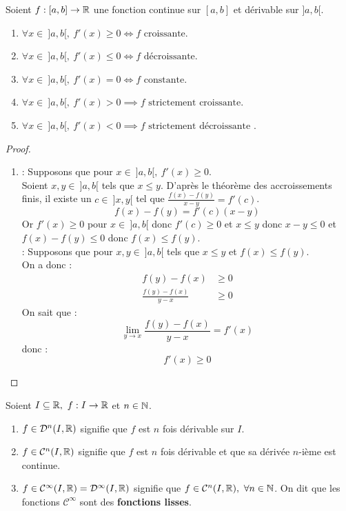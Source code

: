\begin{proposition}
    Soient $f : [a, b] \to \mathbb{R}$ une fonction continue sur $[a, b]$ et dérivable sur $]a, b[$.
    \begin{enumerate}
            \item $\forall x \in \ ]a, b[,\ f'(x) \geq 0 \iff f \text{ croissante}$.
            \item $\forall x \in \ ]a, b[,\ f'(x) \leq 0 \iff f \text{ décroissante}$.
            \item $\forall x \in \ ]a, b[,\ f'(x) = 0 \iff f \text{ constante}$.
            \item $\forall x \in \ ]a, b[,\ f'(x) > 0 \implies f \text{ strictement croissante}$.
            \item $\forall x \in \ ]a, b[,\ f'(x) < 0 \implies f \text{ strictement décroissante}$ .
        \end{enumerate}
\end{proposition}

\begin{proof}
	\leavevmode
	\begin{enumerate}
		\item \boxed{\implies} : Supposons que pour $x \in \ ]a, b[,\ f'(x) \geq 0$. \\
		Soient $x, y \in \ ]a, b[$ tels que $x \leq y$. D'après le théorème des accroissements finis, il existe un $c \in \ ]x, y[$ tel que $\frac{f(x) - f(y)}{x - y} = f'(c)$.
		\[ f(x) - f(y) = f'(c)(x - y) \]
		Or $f'(x) \geq 0$ pour $x \in \ ]a, b[$ donc $f'(c) \geq 0$ et $x \leq y$ donc $x - y \leq 0$ et $f(x) - f(y) \leq 0$ donc  $f(x) \leq f(y)$.
		\\
		\boxed{\impliedby} : Supposons que pour $x, y \in \ ]a, b[$ tels que $x \leq y$ et $f(x) \leq f(y)$. \\
		On a donc :
		\begin{align*}
			f(y) - f(x) &\geq 0 \\
			\frac{f(y) - f(x)}{y - x} &\geq 0 
		\end{align*}
		On sait que :
		\[ \lim_{y \to x} \frac{f(y) - f(x)}{y - x} = f'(x) \]
		donc :
		\[ f'(x) \geq 0 \]
	\end{enumerate}
\end{proof}

\begin{definition}
	Soient $I \subseteq \mathbb{R},\ f : I \to \mathbb{R}$ et $n \in \mathbb{N}$.
	\begin{enumerate}
		\item $f \in \mathcal{D}^n(I, \mathbb{R})$ signifie que $f$ est $n$ fois dérivable sur $I$.
		\item $f \in \mathcal{C}^n(I, \mathbb{R})$ signifie que $f$ est $n$ fois dérivable et que sa dérivée $n$-ième est continue.
		\item $f \in \mathcal{C}^{\infty}(I, \mathbb{R}) = \mathcal{D}^{\infty}(I, \mathbb{R})$ signifie que $f \in \mathcal{C}^n(I, \mathbb{R}),\ \forall n \in \mathbb{N}$. On dit que les fonctions $\mathcal{C}^{\infty}$ sont des \textbf{fonctions lisses}.
	\end{enumerate}
\end{definition}

